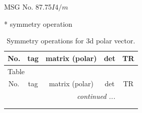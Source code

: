 \documentclass[fleqn,8pt]{jsarticle}
\begin{document}
\setcounter{MaxMatrixCols}{32}

\renewcommand{\tablename}{Table~}
\renewcommand{\figurename}{Figure~}
\begin{center}
\LARGE
MSG No. 87.75\quad$I4/m$
\end{center}
* symmetry operation
\renewcommand{\arraystretch}{1.3}
\begin{longtable}{ccccc}
\caption{Symmetry operations for 3d polar vector.}
 \\
 \hline \hline
No. & tag & matrix (polar) & det & TR \\ \hline \endfirsthead

\multicolumn{4}{l}{\tablename\ \thetable{}} \\
 \hline \hline
No. & tag & matrix (polar) & det & TR \\ \hline \endhead

 \hline \hline
\multicolumn{4}{r}{\footnotesize\it continued ...} \\ \endfoot

 \hline \hline
\multicolumn{4}{r}{} \\ \endlastfoot


\end{longtable}
\end{document}
